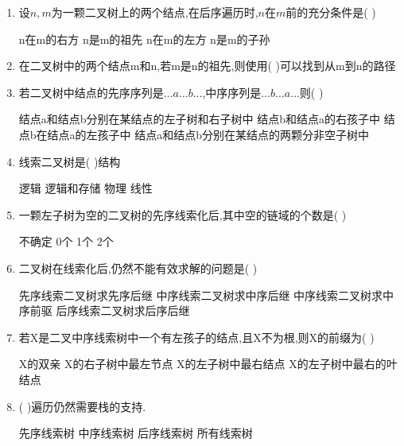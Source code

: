 \documentclass[12pt, a4paper, oneside, UTF8]{ctexbook}
\begin{document}
\begin{enumerate}
    \item 设$n,m$为一颗二叉树上的两个结点,在后序遍历时,$n$在$m$前的充分条件是(    ) 
    \begin{choices}
        \task n在m的右方 
        \task n是m的祖先
        \task n在m的左方
        \task n是m的子孙 
    \end{choices}


    \item 在二叉树中的两个结点m和n,若m是n的祖先,则使用(    )可以找到从m到n的路径 
    

    \item 若二叉树中结点的先序序列是$\ldots a\ldots b\ldots$,中序序列是$\ldots b\ldots a\ldots$则(    ) 
    \begin{choices}[1]
        \task 结点a和结点b分别在某结点的左子树和右子树中
        \task 结点b和结点a的右孩子中
        \task 结点b在结点a的左孩子中
        \task 结点a和结点b分别在某结点的两颗分非空子树中 
    \end{choices}


    \item 线索二叉树是(    )结构 
    \begin{choices}
        \task 逻辑
        \task 逻辑和存储
        \task 物理
        \task 线性
    \end{choices}

    \item 一颗左子树为空的二叉树的先序线索化后,其中空的链域的个数是(    ) 
    \begin{choices}
        \task 不确定
        \task 0个
        \task 1个
        \task 2个
    \end{choices} 


    \item 二叉树在线索化后,仍然不能有效求解的问题是(    ) 
    \begin{choices}[2]
        \task 先序线索二叉树求先序后继
        \task 中序线索二叉树求中序后继
        \task 中序线索二叉树求中序前驱
        \task 后序线索二叉树求后序后继 
    \end{choices}


    \item 若X是二叉中序线索树中一个有左孩子的结点,且X不为根,则X的前缀为(    ) 
    \begin{choices}[2]
        \task X的双亲
        \task X的右子树中最左节点
        \task X的左子树中最右结点
        \task X的左子树中最右的叶结点
    \end{choices}



    \item (   )遍历仍然需要栈的支持. 
    \begin{choices}
        \task 先序线索树
        \task 中序线索树
        \task 后序线索树 
        \task 所有线索树 
    \end{choices}



\end{enumerate}
\end{document}
